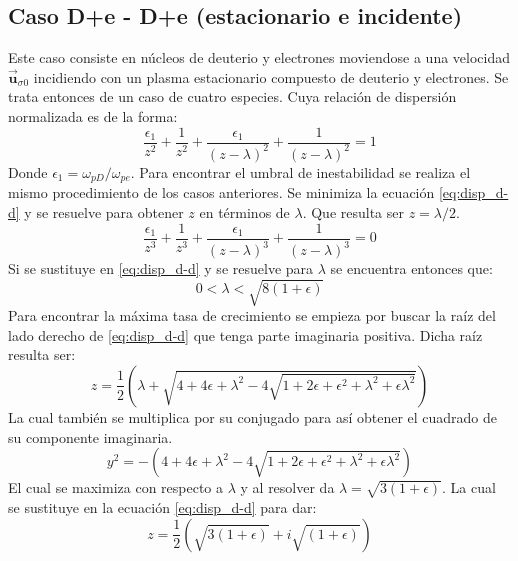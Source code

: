 \documentclass[12pt]{article}
\begin{document}
\subsection*{Caso D+e - D+e (estacionario e incidente)}
Este caso consiste en núcleos de deuterio y electrones moviendose a una velocidad $\overrightarrow{\textbf{u}}_{\sigma 0}$ incidiendo con un plasma estacionario compuesto de deuterio y electrones. Se trata entonces de un caso de cuatro especies. Cuya relación de dispersión normalizada es de la forma:
\begin{equation}
\label{eq:disp_d-d}
\frac{\epsilon_1}{z^2}+\frac{1}{z^2}+\frac{\epsilon_1}{(z-\lambda)^2}+\frac{1}{(z-\lambda)^2}=1
\end{equation}
Donde $\epsilon_1 = \omega_{pD}/ \omega_{pe}$. Para encontrar el umbral de inestabilidad se realiza el mismo procedimiento de los casos anteriores. Se minimiza la ecuación \ref{eq:disp_d-d} y se resuelve para obtener $z$ en términos de $\lambda$. Que resulta ser $z=\lambda /2$.
\begin{equation}
\frac{\epsilon_1}{z^3}+\frac{1}{z^3}+\frac{\epsilon_1}{(z-\lambda)^3}+\frac{1}{(z-\lambda)^3}=0
\end{equation}
Si se sustituye en \ref{eq:disp_d-d} y se resuelve para $\lambda$ se encuentra entonces que:
\begin{equation}
0 < \lambda < \sqrt{8(1+\epsilon)}
\end{equation}
Para encontrar la máxima tasa de crecimiento se empieza por buscar la raíz del lado derecho de \ref{eq:disp_d-d} que tenga parte imaginaria positiva. Dicha raíz resulta ser:
\begin{equation}
\label{eq:raiz_d-d}
z =\frac{1}{2}\left(\lambda + \sqrt{4 + 4\epsilon + \lambda ^2 -4\sqrt{1+2\epsilon + \epsilon^2+ \lambda^2 + \epsilon \lambda ^2}} \right)
\end{equation}
La cual también se multiplica por su conjugado para así obtener el cuadrado de su componente imaginaria.
\begin{equation}
y^2 = -\left(4 + 4\epsilon + \lambda ^2 -4\sqrt{1+2\epsilon + \epsilon^2+ \lambda^2 + \epsilon \lambda ^2}\right)
\end{equation}
El cual se maximiza con respecto a $\lambda$ y al resolver da $\lambda = \sqrt{3(1 + \epsilon)}$. La cual se sustituye en la ecuación \ref{eq:disp_d-d} para dar:
\begin{equation}
\label{eq:z-max-d-d}
z = \frac{1}{2}\left(\sqrt{3(1+\epsilon)} + i \sqrt{(1+\epsilon)} \right)
\end{equation}
\end{document}

